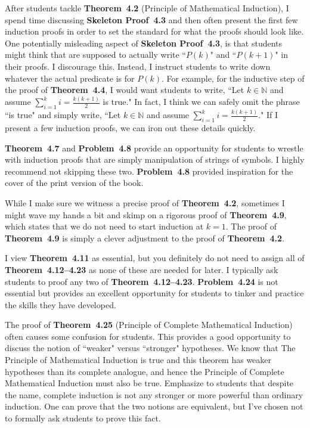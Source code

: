 \documentclass[11pt]{article}%
\newcommand{\blankline}{\pagebreak[2]\vspace{.5\baselineskip}}
\begin{document}
After students tackle \textbf{Theorem~4.2} (Principle of Mathematical Induction), I spend time discussing \textbf{Skeleton Proof~4.3} and then often present the first few induction proofs in order to set the standard for what the proofs should look like. One potentially misleading aspect of \textbf{Skeleton Proof~4.3}, is that students might think that are supposed to actually write ``$P(k)$" and ``$P(k+1)$" in their proofs.  I discourage this.  Instead, I instruct students to write down whatever the actual predicate is for $P(k)$.  For example, for the inductive step of the proof of \textbf{Theorem~4.4}, I would want students to write, ``Let $k\in\mathbb{N}$ and assume $\sum_{i=1}^k i=\frac{k(k+1)}{2}$ is true." In fact, I think we can safely omit the phrase ``is true" and simply write, ``Let $k\in\mathbb{N}$ and assume $\sum_{i=1}^k i=\frac{k(k+1)}{2}$."  If I present a few induction proofs, we can iron out these details quickly.

\blankline

\textbf{Theorem~4.7} and \textbf{Problem~4.8} provide an opportunity for students to wrestle with induction proofs that are simply manipulation of strings of symbols.  I highly recommend not skipping these two. \textbf{Problem~4.8} provided inspiration for the cover of the print version of the book.

\blankline

While I make sure we witness a precise proof of \textbf{Theorem~4.2}, sometimes I might wave my hands a bit and skimp on a rigorous proof of \textbf{Theorem~4.9}, which states that we do not need to start induction at $k=1$.  The proof of \textbf{Theorem~4.9} is simply a clever adjustment to the proof of \textbf{Theorem~4.2}.  

\blankline

I view \textbf{Theorem~4.11} as essential, but you definitely do not need to assign all of \textbf{Theorem~4.12--4.23} as none of these are needed for later.  I typically ask students to proof any two of \textbf{Theorem~4.12--4.23}.  \textbf{Problem~4.24} is not essential but provides an excellent opportunity for students to tinker and practice the skills they have developed.

\blankline

The proof of \textbf{Theorem~4.25} (Principle of Complete Mathematical Induction) often causes some confusion for students.  This provides a good opportunity to discuss the notion of ``weaker" versus ``stronger" hypotheses.  We know that The Principle of Mathematical Induction is true and this theorem has weaker hypotheses than its complete analogue, and hence the Principle of Complete Mathematical Induction must also be true.  Emphasize to students that despite the name, complete induction is not any stronger or more powerful than ordinary induction.  One can prove that the two notions are equivalent, but I've chosen not to formally ask students to prove this fact.
\end{document}
